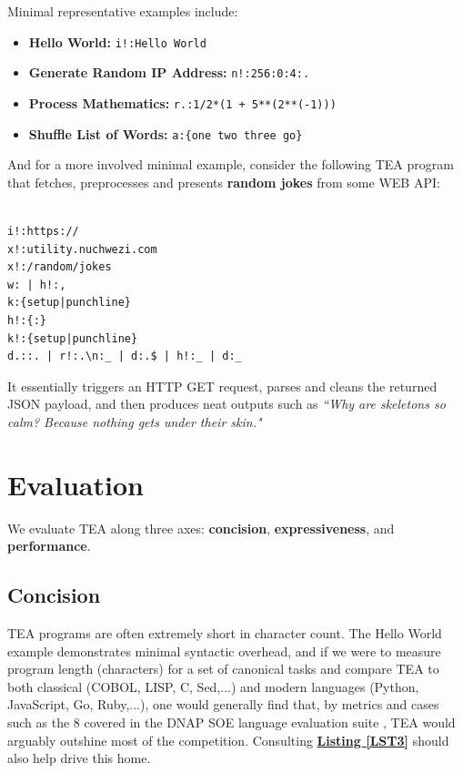 \documentclass[acmtoplas]{acmart}
\begin{document}
Minimal representative examples include:
\begin{itemize}
  \item \textbf{Hello World:} \texttt{i!:Hello World}
  \item \textbf{Generate Random IP Address:} \texttt{n!:256:0:4:.}
  \item \textbf{Process Mathematics:} \texttt{r.:{1/2*(1 + 5**(2**(-1)))}}
  \item \textbf{Shuffle List of Words:} \texttt{a:\{one two three go\}}
\end{itemize}

And for a more involved minimal example, consider the following TEA program that fetches, preprocesses and presents \textbf{random jokes} from some WEB API:

\vspace{1em}
\begin{lstlisting}[style=tea,caption=EDUTAINMENT: Random Jokes v2.1,label=LST2]                    
                   
i!:https://
x!:utility.nuchwezi.com
x!:/random/jokes
w: | h!:,
k:{setup|punchline}
h!:{:}
k!:{setup|punchline}
d.::. | r!:.\n:_ | d:.$ | h!:_ | d:_
\end{lstlisting}
\vspace{1em}

It essentially triggers an HTTP GET request, parses and cleans the returned JSON payload, and then produces neat outputs such as \textit{``Why are skeletons so calm?
Because nothing gets under their skin."}

\section{Evaluation}
\label{SEC6}

We evaluate TEA along three axes: \textbf{concision}, \textbf{expressiveness}, and \textbf{performance}.

\subsection{Concision}

TEA programs are often extremely short in character count. The Hello World example demonstrates minimal syntactic overhead, and if we were to measure program length (characters) for a set of canonical tasks and compare TEA to both classical (COBOL, LISP, C, Sed,...) and modern languages (Python, JavaScript, Go, Ruby,...), one would generally find that, by metrics and cases such as the 8 covered in the DNAP SOE language evaluation suite \cite{lutalo2023dnapsoe}, TEA would arguably outshine most of the competition. Consulting \textbf{\hyperref[LST3]{Listing \ref{LST3}}} should also help drive this home.
\end{document}
